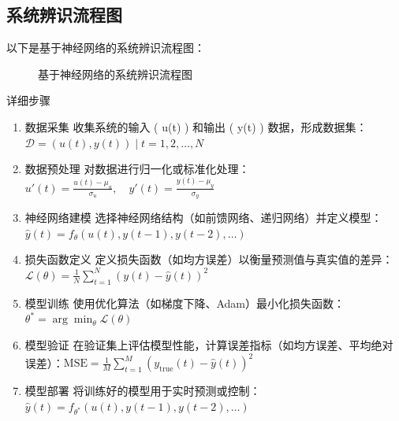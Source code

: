 \documentclass[12pt, AutoFakeBold=4]{ctexart}
\begin{document}
\subsection{系统辨识流程图}
以下是基于神经网络的系统辨识流程图：
\begin{figure}[H]
    \centering
    \caption{基于神经网络的系统辨识流程图}
\end{figure}\par
{\Large \heiti 详细步骤}
\begin{enumerate}
\item {\heiti 数据采集}
收集系统的输入 ( u(t) ) 和输出 ( y(t) ) 数据，形成数据集：$  \mathcal{D} = {(u(t), y(t)) \mid t = 1, 2, \dots, N} $

\item {\heiti 数据预处理}
对数据进行归一化或标准化处理：$  u'(t) = \frac{u(t) - \mu_u}{\sigma_u}, \quad y'(t) = \frac{y(t) - \mu_y}{\sigma_y} $

\item {\heiti 神经网络建模}
选择神经网络结构（如前馈网络、递归网络）并定义模型： $ \hat{y}(t) = f_\theta(u(t), y(t-1), y(t-2), \dots)  $
\item {\heiti 损失函数定义}
定义损失函数（如均方误差）以衡量预测值与真实值的差异： $ \mathcal{L}(\theta) = \frac{1}{N} \sum_{t=1}^N \left( y(t) - \hat{y}(t) \right)^2 $

\item {\heiti 模型训练}
使用优化算法（如梯度下降、Adam）最小化损失函数：$  \theta^* = \arg\min_\theta \mathcal{L}(\theta) $

\item {\heiti 模型验证}
在验证集上评估模型性能，计算误差指标（如均方误差、平均绝对误差）：$  \text{MSE} = \frac{1}{M} \sum_{t=1}^M \left( y_{\text{true}}(t) - \hat{y}(t) \right)^2 $

\item {\heiti 模型部署}
将训练好的模型用于实时预测或控制：$  \hat{y}(t) = f_{\theta^*}(u(t), y(t-1), y(t-2), \dots) $
\end{enumerate}
\newpage
\end{document}
